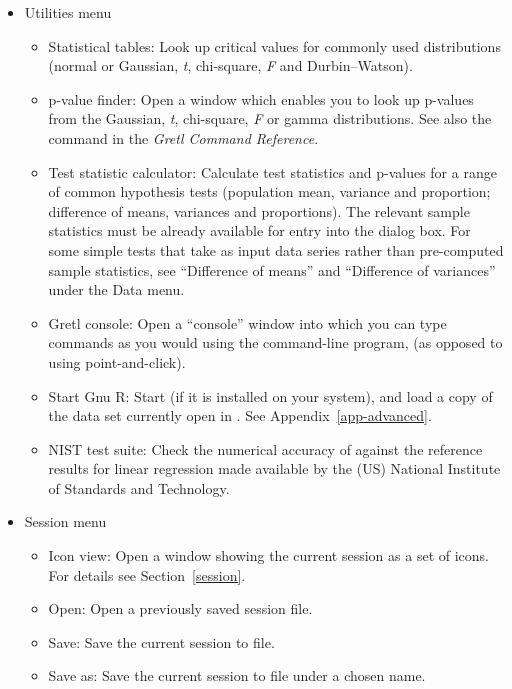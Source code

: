 \begin{itemize}
\item \textsf{Utilities menu}
  \begin{itemize}
  \item \textsf{Statistical tables}: Look up critical values for
    commonly used distributions (normal or Gaussian, \emph{t},
    chi-square, \emph{F} and Durbin--Watson).
  \item \textsf{p-value finder}: Open a window which enables you to
    look up p-values from the Gaussian, \emph{t}, chi-square, \emph{F}
    or gamma distributions. See also the  command in the
    \emph{Gretl Command Reference}.
  \item \textsf{Test statistic calculator}: Calculate test statistics
    and p-values for a range of common hypothesis tests (population
    mean, variance and proportion; difference of means, variances and
    proportions).  The relevant sample statistics must be already
    available for entry into the dialog box. For some simple tests
    that take as input data series rather than pre-computed sample
    statistics, see ``Difference of means'' and ``Difference of
    variances'' under the Data menu.
  \item \textsf{Gretl console}: Open a ``console'' window into which
    you can type commands as you would using the command-line program,
     (as opposed to using point-and-click).
  \item \textsf{Start Gnu R}: Start  (if it is installed on
    your system), and load a copy of the data set currently open in
    .  See Appendix~\ref{app-advanced}.
  \item \textsf{NIST test suite}: Check the numerical accuracy of
     against the reference results for linear regression
    made available by the (US) National Institute of Standards and
    Technology.
  \end{itemize}

\item \textsf{Session menu}
  \begin{itemize}
  \item \textsf{Icon view}: Open a window showing the current
     session as a set of icons.  For details see
    Section~\ref{session}.
  \item \textsf{Open}: Open a previously saved session file.
  \item \textsf{Save}: Save the current session to file.
  \item \textsf{Save as}: Save the current session to file under a
    chosen name.
  \end{itemize}


\end{itemize}
